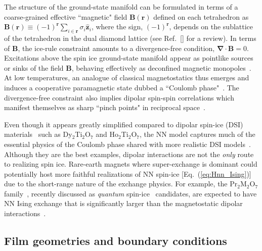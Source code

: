 \documentclass[aps,prx,reprint,runinaddress,superscriptaddress,amsmath,amssymb,floatfix,longbibliography]{revtex4-1}
\renewcommand{\vec}[1]{\boldsymbol{#1}}
\begin{document}
The structure of the ground-state manifold can be formulated in terms of a coarse-grained effective ``magnetic" field $\vec{B}(\vec{r})$ defined on each tetrahedron as  $\vec{B}(\vec{r}) \equiv (-1)^{\vec{r}} \sum_{i \in \vec{r}} \sigma_i \vec{\hat{z}}_i $, where the sign, $(-1)^{\vec{r}}$, depends on the sublattice of the tetrahedron in the dual diamond lattice (see Ref.~[] for a review). In terms of $\vec{B}$, the ice-rule constraint amounts to a divergence-free condition, $\vec{\nabla}\cdot \vec{B} = 0$. Excitations above the spin ice ground-state manifold appear as pointlike sources or sinks of the field $\vec{B}$, behaving effectively as deconfined magnetic monopoles~\cite{Castelnovo2008a}. At low temperatures, an analogue of classical magnetostatics thus emerges and induces
a cooperative paramagnetic state dubbed a ``Coulomb phase"~\cite{Henley2010}. The divergence-free constraint also implies dipolar spin-spin correlations which manifest themselves as sharp ``pinch points" in reciprocal space~\cite{Henley2005,Henley2010}.

Even though it appears greatly simplified compared to dipolar spin-ice (\ac{DSI}) materials~\cite{DenHertog2000} such as Dy$_2$Ti$_2$O$_7$ and Ho$_2$Ti$_2$O$_7$, the \ac{NN} model captures much of the essential physics of the Coulomb phase shared with more realistic \ac{DSI} models~\cite{Castelnovo2008a,DenHertog2000,Isakov2005,Gingras2001CJP}. Although they are the best examples, dipolar interactions are not the \emph{only} route to realizing spin ice. Rare-earth magnets where super-exchange is dominant could potentially host more faithful realizations of \ac{NN} spin-ice [Eq.~(\ref{eq:Hnn_Ising})] due to the short-range nature of the exchange physics. For example, the Pr$_2$M$_2$O$_7$ family~\cite{Zhou2008,kimura2013quantum,Sibille2016}, recently discussed as \emph{quantum} spin-ice~\cite{Gingras2014} candidates, are expected to have \ac{NN} Ising exchange that is significantly larger than the magnetostatic dipolar interactions~\cite{onoda2010,onoda2011}.


\subsection{Film geometries and boundary conditions}
\label{sec:geometries}
\end{document}
